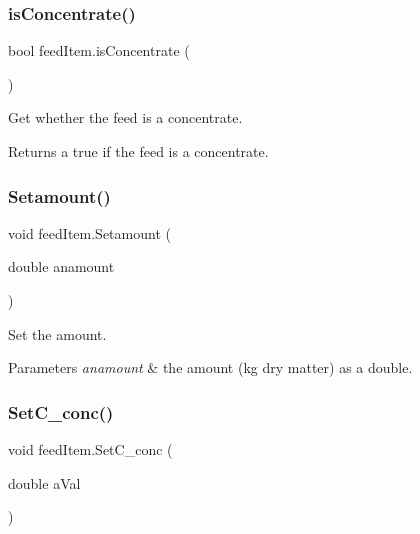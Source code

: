 \subsubsection{\texorpdfstring{isConcentrate()}{isConcentrate()}}
{\footnotesize\ttfamily bool feed\+Item.\+is\+Concentrate (\begin{DoxyParamCaption}{ }\end{DoxyParamCaption})\hspace{0.3cm}{\ttfamily [inline]}}



Get whether the feed is a concentrate. 

\begin{DoxyReturn}{Returns}
a true if the feed is a concentrate. 
\end{DoxyReturn}
\mbox{\label{classfeed_item_a74cdd944c0859600cda02409e11d00a5}} 
\subsubsection{\texorpdfstring{Setamount()}{Setamount()}}
{\footnotesize\ttfamily void feed\+Item.\+Setamount (\begin{DoxyParamCaption}\item[{double}]{anamount }\end{DoxyParamCaption})\hspace{0.3cm}{\ttfamily [inline]}}



Set the amount. 


\begin{DoxyParams}{Parameters}
{\em anamount} & the amount (kg dry matter) as a double. \\
\hline
\end{DoxyParams}
\mbox{\label{classfeed_item_acc5a752b15d91d6d457f2c6fb68f3ce7}} 
\subsubsection{\texorpdfstring{SetC\_conc()}{SetC\_conc()}}
{\footnotesize\ttfamily void feed\+Item.\+Set\+C\+\_\+conc (\begin{DoxyParamCaption}\item[{double}]{a\+Val }\end{DoxyParamCaption})\hspace{0.3cm}{\ttfamily [inline]}}




